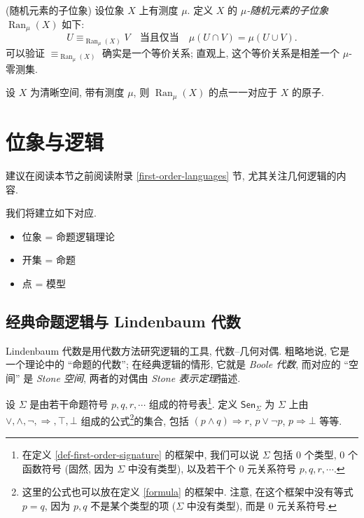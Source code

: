\begin{propdef}
	{(随机元素的子位象)}
	设位象 $X$ 上有测度 $\mu$. 定义 $X$ 的 \emph{$\mu$-随机元素的子位象} $\operatorname{Ran}_\mu(X)$ 如下:
	$$
	U\equiv_{\operatorname{Ran}_\mu(X)} V \quad \text{当且仅当}\quad \mu(U\cap V) = \mu(U\cup V).
	$$
	可以验证 $\equiv_{\operatorname{Ran}_\mu(X)}$ 确实是一个等价关系; 直观上, 这个等价关系是相差一个 $\mu$-零测集.
\end{propdef}

\begin{prop}
	{}
	设 $X$ 为清晰空间, 带有测度 $\mu$, 则 $\operatorname{Ran}_\mu(X)$ 的点一一对应于 $X$ 的原子.
\end{prop}


\todo{}

\section{位象与逻辑}


建议在阅读本节之前阅读附录 \ref{first-order-languages} 节, 尤其关注几何逻辑的内容.


我们将建立如下对应.

\begin{itemize}
	\item 位象 = 命题逻辑理论
	\item 开集 = 命题
	\item 点 = 模型
\end{itemize}

\subsection{经典命题逻辑与 Lindenbaum 代数}

Lindenbaum 代数是用代数方法研究逻辑的工具, 代数--几何对偶. 粗略地说, 它是一个理论中的 ``命题的代数''; 在经典逻辑的情形, 它就是 \emph{Boole 代数}, 而对应的 ``空间'' 是 \emph{Stone 空间}, 两者的对偶由 \emph{Stone 表示定理}描述.

设 $\Sigma$ 是由若干命题符号 $p,q,r,\cdots$ 组成的符号表\footnote{在定义 \ref{def-first-order-signature} 的框架中, 我们可以说 $\Sigma$ 包括 $0$ 个类型, $0$ 个函数符号 (固然, 因为 $\Sigma$ 中没有类型), 以及若干个 $0$ 元关系符号 $p,q,r,\cdots$.}.
定义 $\mathsf {Sen}_\Sigma$ 为 $\Sigma$ 上由 $\lor,\land,\neg,\Rightarrow,\top,\bot$ 组成的公式\footnote{这里的公式也可以放在定义 \ref{formula} 的框架中. 注意, 在这个框架中没有等式 $p=q$, 因为 $p,q$ 不是某个类型的项 ($\Sigma$ 中没有类型), 而是 $0$ 元关系符号.}的集合, 包括 $(p\land q)\Rightarrow r$, $p\lor\neg p$, $p\Rightarrow\bot$ 等等.

